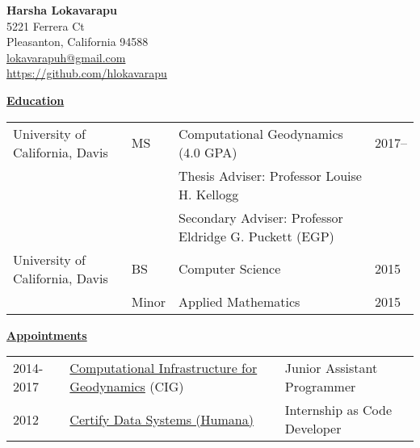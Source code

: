 \documentclass[11pt]{ltxdoc}
\begin{document}
\begin{center}
  \textbf{Harsha Lokavarapu}                                            \\ [06pt]
  5221 Ferrera Ct                                                       \\
  Pleasanton, California 94588                                          \\
 \href{mailto:lokavarapuh@gmail.com}{lokavarapuh@gmail.com}             \\
  \href{https://github.com/hlokavarapu}{https://github.com/hlokavarapu} \\ [3pt]
\end{center}


\vskip 12pt

\begin{center}
	\textbf{\underline{Education}}
\end{center}

\vskip -06pt

\begin{tabular}{llll}
University of California, Davis              &MS       &Computational Geodynamics (4.0 GPA)      & 2017-- \\
                                             &       &Thesis Adviser: Professor Louise H. Kellogg           &  \\
                                                                                          &       &Secondary Adviser: Professor Eldridge G. Puckett (EGP)      &  \\
University of California, Davis              &BS      & Computer Science                         & 2015       \\
                                             &Minor   & Applied Mathematics                      & 2015
\end{tabular}

\vskip 18pt

\begin{center}
	\textbf{\underline{Appointments}}
\end{center}

\begin{tabular}{lll}
2014-2017     & \href{https://geodynamics.org/cig/}{Computational Infrastructure for Geodynamics} (CIG) & Junior Assistant Programmer \\
2012       & \href{https://www.humana.com}{Certify Data Systems (Humana)} & Internship as Code Developer
\end{tabular}
\end{document}
